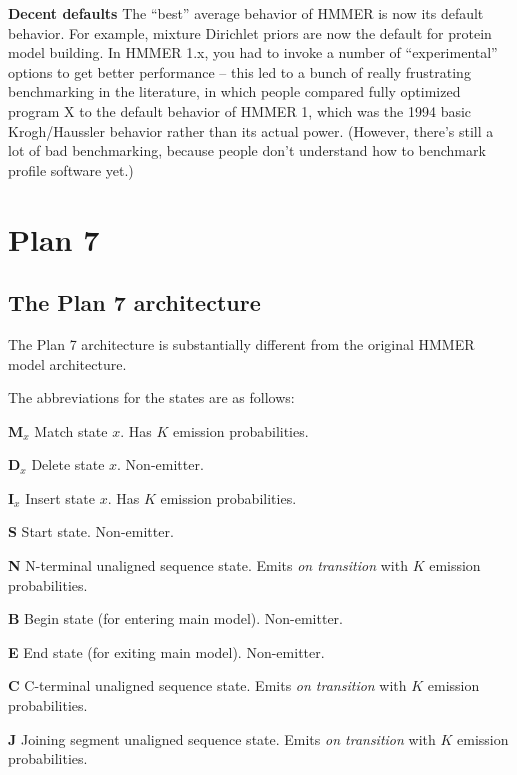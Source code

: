 \documentclass[11pt]{report}
\newenvironment{wideitem}{\begin{list} 
     {}
     { \setlength{\labelwidth}{2in}\setlength{\leftmargin}{1.5in}}}
     {\end{list}}
\begin{document}
\begin{wideitem}
\item [\textbf{Decent defaults}] The ``best'' average behavior of HMMER is now its
default behavior. For example, mixture Dirichlet priors are now the
default for protein model building. In HMMER 1.x, you had to invoke a
number of ``experimental'' options to get better performance -- this
led to a bunch of really frustrating benchmarking in the literature,
in which people compared fully optimized program X to the default
behavior of HMMER 1, which was the 1994 basic Krogh/Haussler behavior
rather than its actual power. (However, there's still a lot of bad
benchmarking, because people don't understand how to benchmark profile
software yet.)

\end{wideitem}

\section{Plan 7}

\subsection{The Plan 7 architecture}

The Plan 7 architecture is substantially different from the original
HMMER model architecture. 

The abbreviations for the states are as follows:

\begin{wideitem}
\item [\textbf{M$_x$}] Match state $x$.  Has $K$ emission probabilities.
\item [\textbf{D$_x$}] Delete state $x$. Non-emitter.
\item [\textbf{I$_x$}] Insert state $x$. Has $K$ emission probabilities.
\item [\textbf{S}]     Start state. Non-emitter.
\item [\textbf{N}]     N-terminal unaligned sequence state. 
    Emits \textit{on transition} with $K$ emission probabilities.
\item [\textbf{B}]     Begin state (for entering main model). Non-emitter.
\item [\textbf{E}]     End state (for exiting main model). Non-emitter.
\item [\textbf{C}]     C-terminal unaligned sequence state.
    Emits \textit{on transition} with $K$ emission probabilities.
\item [\textbf{J}]     Joining segment unaligned sequence state.
    Emits \textit{on transition} with $K$ emission probabilities.
\end{wideitem}
\end{document}

